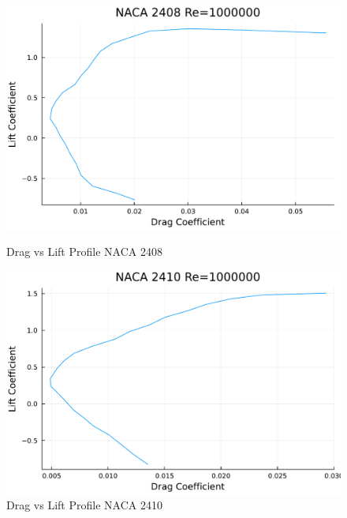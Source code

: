 \documentclass{article}
\begin{document}
\begin{figure}[h]
    \centering
\begin{minipage}[b]{0.32\textwidth}
\centering
\includegraphics[width=\textwidth]{NACA 2408 Re=1000000_Drag_vs_Lift_Coefficent_Plot.pdf}
\caption{\label{fig:NACA 2408 Drag Lift}Drag vs Lift Profile NACA 2408}
\end{minipage}
\begin{minipage}[b]{0.32\textwidth}
\centering
\includegraphics[width=\textwidth]{NACA 2410 Re=1000000_Drag_vs_Lift_Coefficent_Plot.pdf}
\caption{\label{fig:NACA 2410 Drag Lift}Drag vs Lift Profile NACA 2410}
\end{minipage}
\begin{minipage}[b]{0.32\textwidth}
\centering

\end{minipage}
\end{figure}
\end{document}
